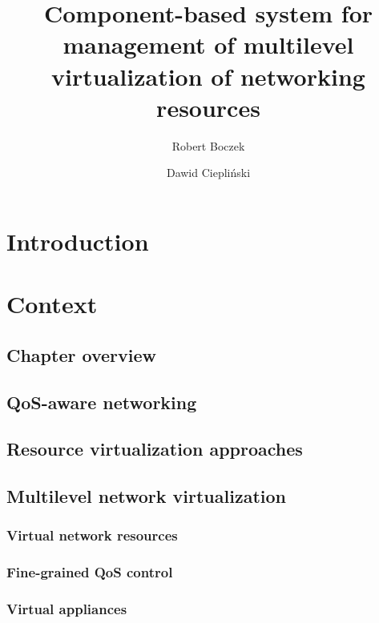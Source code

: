 \documentclass[11pt]{book}
\title{Component-based system for management of multilevel virtualization of networking resources}
\author{Robert Boczek \and Dawid Ciepliński}
\begin{document}
  \maketitle
    
  \tableofcontents


  \chapter{Introduction}



  \chapter{Context}  %

    \section*{Chapter overview}


    \section{QoS-aware networking}



    \section{Resource virtualization approaches}



    \section{Multilevel network virtualization}

      \subsection{Virtual network resources}

      \subsection{Fine-grained QoS control}

      \subsection{Virtual appliances}
\end{document}
